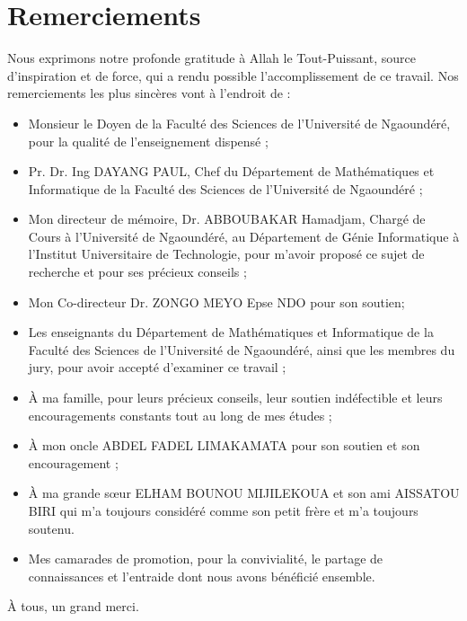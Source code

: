 \chapter*{Remerciements}

\renewcommand{\abstractnamefont}{\normalfont\Large\bfseries}


\hskip7mm
\begin{spacing}{1.3}
Nous exprimons notre profonde gratitude à Allah le Tout-Puissant, source d’inspiration et de force, qui a rendu possible l’accomplissement de ce travail. Nos remerciements les plus sincères vont à l’endroit de : 
\begin{itemize}
	\item Monsieur le Doyen de la Faculté des Sciences de l’Université de Ngaoundéré, pour la qualité de l’enseignement dispensé ;
    \item Pr. Dr. Ing DAYANG PAUL, Chef du Département de Mathématiques et Informatique de la Faculté des Sciences de l’Université de Ngaoundéré ;
    \item Mon directeur de mémoire, Dr. ABBOUBAKAR Hamadjam, Chargé de Cours à l’Université de Ngaoundéré, au Département de Génie Informatique à l’Institut Universitaire de Technologie, pour m'avoir proposé ce sujet de recherche et pour ses précieux conseils ;
    \item Mon Co-directeur Dr. ZONGO MEYO Epse NDO pour son soutien; 
    \item Les enseignants du Département de Mathématiques et Informatique de la Faculté des Sciences de l’Université de Ngaoundéré, ainsi que les membres du jury, pour avoir accepté d'examiner ce travail ;
    \item À ma famille, pour leurs précieux conseils, leur soutien indéfectible et leurs encouragements constants tout au long de mes études ;
    \item À mon oncle ABDEL FADEL LIMAKAMATA pour son soutien et son encouragement ;
    \item À ma grande sœur ELHAM BOUNOU MIJILEKOUA et son ami AISSATOU BIRI qui m'a toujours considéré comme son petit frère et m'a toujours soutenu.   
    \item Mes camarades de promotion, pour la convivialité, le partage de connaissances et l'entraide dont nous avons bénéficié ensemble.
\end{itemize}

À tous, un grand merci.
\end{spacing}
